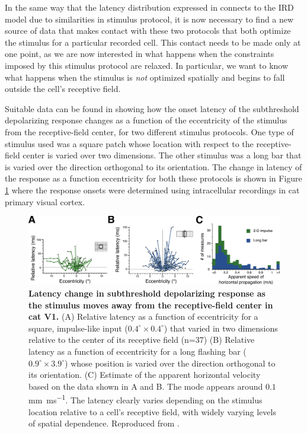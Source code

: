 \documentclass[phd,ianc,twoside]{infthesis}
\begin{document}
In the same way that the latency distribution expressed in
\citet{nowak_visneuro95} connects to the IRD model due to similarities
in stimulus protocol, it is now necessary to find a new source of data
that makes contact with these two protocols that both optimize the
stimulus for a particular recorded cell. This contact needs to be made
only at one point, as we are now interested in what happens when the
constraints imposed by this stimulus protocol are relaxed. In
particular, we want to know what happens when the stimulus is \emph{not}
optimized spatially and begins to fall outside the cell's receptive
field.

Suitable data can be found in \citet{bringuier_science99} showing how
the onset latency of the subthreshold depolarizing response changes as a
function of the eccentricity of the stimulus from the receptive-field
center, for two different stimulus protocols. One type of stimulus used
was a square patch whose location with respect to the receptive-field
center is varied over two dimensions. The other stimulus was a long bar
that is varied over the direction orthogonal to its orientation. The
change in latency of the response as a function eccentricity for both
these protocols is shown in Figure \ref{fig:bringuier_data} where the
response onsets were determined using intracellular recordings in cat
primary visual cortex.


\begin{figure}
\center
\includegraphics[width=1.0\textwidth]{./figures/bringuier_data.pdf}
\caption{{\bf Latency change in subthreshold depolarizing response as
    the stimulus moves away from the receptive-field center in cat V1.}
  (A) Relative latency as a function of eccentricity for a square,
  impulse-like input ($0.4^\circ \times 0.4^\circ$) that varied in two
  dimensions relative to the center of its receptive field (n=37) (B)
  Relative latency as a function of eccentricity for a long flashing bar
  ($0.9^\circ \times 3.9^\circ$) whose position is varied over the
  direction orthogonal to its orientation.  (C) Estimate of the apparent
  horizontal velocity based on the data shown in A and B. The mode
  appears around $0.1$ \si{mm.ms^{-1}}. The latency clearly varies
  depending on the stimulus location relative to a cell's receptive
  field, with widely varying levels of spatial dependence.  Reproduced
  from \citet{bringuier_science99}.}
\label{fig:bringuier_data}
\end{figure}
\end{document}
